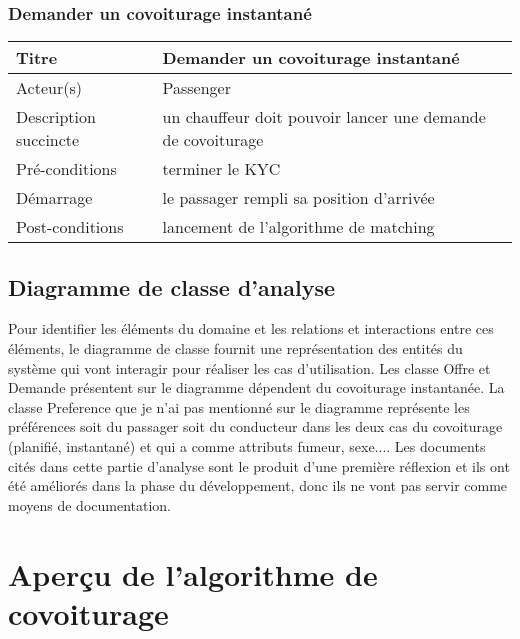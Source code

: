 \subsubsection{Demander un covoiturage instantané} %
\begin{center}
    \begin{tabular}{ | l | p{10cm} |}
    \hline
    Titre & Demander un covoiturage instantané \\ \hline
    Acteur(s) & Passenger \\ \hline
    Description succincte & un chauffeur doit pouvoir lancer une demande de covoiturage \\ \hline
    Pré-conditions & terminer le KYC \\ \hline
    Démarrage & le passager rempli sa position d'arrivée \\ \hline
    Post-conditions & lancement de l'algorithme de matching \\ \hline
    \end{tabular}
\end{center}
\clearpage
\subsection{Diagramme de classe d'analyse} %
Pour identifier les éléments du domaine et les relations et interactions entre ces éléments, le diagramme de classe fournit une représentation des entités du système qui vont interagir pour réaliser les cas d'utilisation.\newline
Les classe Offre et Demande présentent sur le diagramme dépendent du covoiturage instantanée.\newline
La classe Preference que je n'ai pas mentionné sur le diagramme représente les préférences soit du passager soit du conducteur dans les deux cas du covoiturage (planifié, instantané) et qui a comme attributs fumeur, sexe....
Les documents cités dans cette partie d'analyse sont le produit d'une première réflexion et ils ont été améliorés dans la phase du développement, donc ils ne vont pas servir comme moyens de documentation.
\clearpage
\section{Aperçu de l'algorithme de covoiturage} %
\label{sec:Aperçu de l'algorithme de covoiturage}
